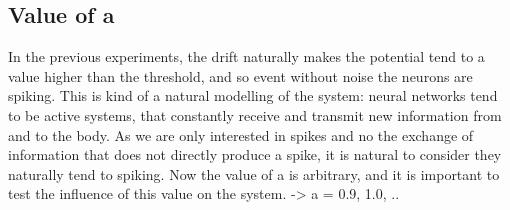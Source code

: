 	\subsection{Value of a}
	In the previous experiments, the drift naturally makes the potential tend to a value higher than the threshold, and so event without noise the neurons are spiking. This is kind of a natural modelling of the system: neural networks tend to be active systems, that constantly receive and transmit new information from and to the body. As we are only interested in spikes and no the exchange of information that does not directly produce a spike, it is natural to consider they naturally tend to spiking. Now the value of a is arbitrary, and it is important to test the influence of this value on the system. -> a = 0.9, 1.0, ..